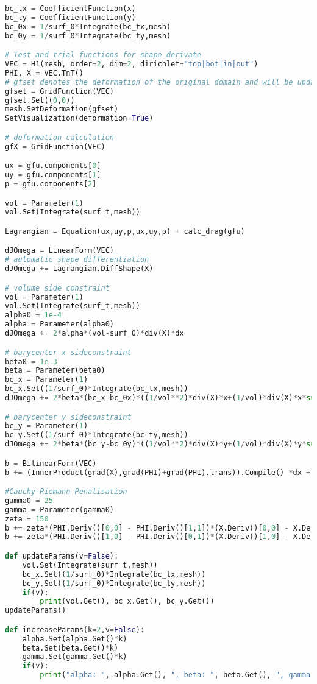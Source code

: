 \begin{appendix}
\begin{lstlisting}[language=Python, title=NGSolve Shape Optimization Code in Python, label=final_code]
bc_tx = CoefficientFunction(x)
bc_ty = CoefficientFunction(y)
bc_0x = 1/surf_0*Integrate(bc_tx,mesh)
bc_0y = 1/surf_0*Integrate(bc_ty,mesh)

# Test and trial functions for shape derivate
VEC = H1(mesh, order=2, dim=2, dirichlet="top|bot|in|out")
PHI, X = VEC.TnT()
# gfset denotes the deformation of the original domain and will be updated during the shape optimization
gfset = GridFunction(VEC)
gfset.Set((0,0))
mesh.SetDeformation(gfset)
SetVisualization(deformation=True)

# deformation calculation
gfX = GridFunction(VEC)

ux = gfu.components[0]
uy = gfu.components[1]
p = gfu.components[2]

vol = Parameter(1)
vol.Set(Integrate(surf_t,mesh))

Lagrangian = Equation(ux,uy,p,ux,uy,p) + calc_drag(gfu)  

dJOmega = LinearForm(VEC)
# automatic shape differentiation
dJOmega += Lagrangian.DiffShape(X)

# volume side constraint
vol = Parameter(1)
vol.Set(Integrate(surf_t,mesh))
alpha0 = 1e-4
alpha = Parameter(alpha0)
dJOmega += 2*alpha*(vol-surf_0)*div(X)*dx

# barycenter x sideconstraint
beta0 = 1e-3
beta = Parameter(beta0)
bc_x = Parameter(1)
bc_x.Set((1/surf_0)*Integrate(bc_tx,mesh))
dJOmega += 2*beta*(bc_x-bc_0x)*((1/vol**2)*div(X)*x+(1/vol)*div(X)*x*sum(gfset.vecs[0].data)[0])*dx

# barycenter y sideconstraint
bc_y = Parameter(1)
bc_y.Set((1/surf_0)*Integrate(bc_ty,mesh))
dJOmega += 2*beta*(bc_y-bc_0y)*((1/vol**2)*div(X)*y+(1/vol)*div(X)*y*sum(gfset.vecs[0].data)[1])*dx

b = BilinearForm(VEC)
b += (InnerProduct(grad(X),grad(PHI)+grad(PHI).trans)).Compile() *dx + (InnerProduct(X,PHI)).Compile()*dx

#Cauchy-Riemann Penalisation
gamma0 = 25
gamma = Parameter(gamma0)
zeta = 150
b += zeta*(PHI.Deriv()[0,0] - PHI.Deriv()[1,1])*(X.Deriv()[0,0] - X.Deriv()[1,1])*dx
b += zeta*(PHI.Deriv()[1,0] - PHI.Deriv()[0,1])*(X.Deriv()[1,0] - X.Deriv()[0,1])*dx

def updateParams(v=False):
    vol.Set(Integrate(surf_t,mesh))
    bc_x.Set((1/surf_0)*Integrate(bc_tx,mesh))
    bc_y.Set((1/surf_0)*Integrate(bc_ty,mesh))
    if(v):
        print(vol.Get(), bc_x.Get(), bc_y.Get())
updateParams()

def increaseParams(k=2,v=False):
    alpha.Set(alpha.Get()*k)
    beta.Set(beta.Get()*k)
    gamma.Set(gamma.Get()*k)
    if(v):
        print("alpha: ", alpha.Get(), ", beta: ", beta.Get(), ", gamma: ", gamma.Get())


\end{lstlisting}
\end{appendix}
